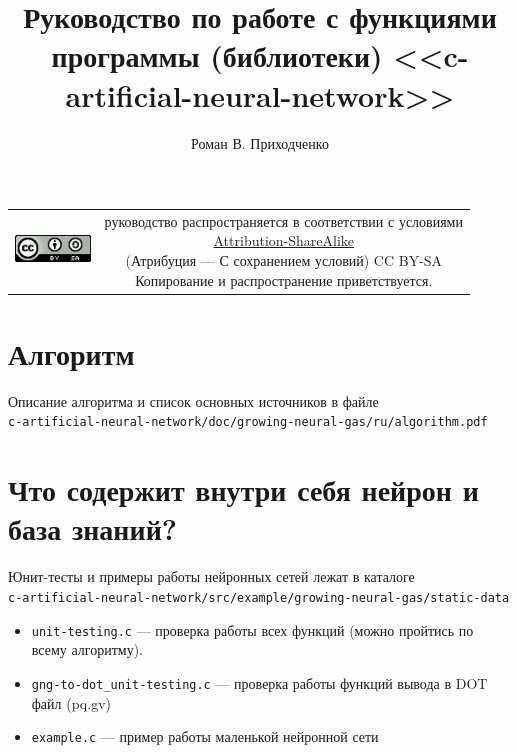 \documentclass[unicode, 12pt, a4paper,oneside,fleqn]{article}
\author{Роман В. Приходченко}
\title{Руководство по работе с функциями программы (библиотеки)
  <<c-artificial-neural-network>>}
\begin{document}
\renewcommand\bibname{СПИСОК ЛИТЕРАТУРЫ}
\renewcommand\refname{\centering Список литературы}
\renewcommand\contentsname{\centering Содержание}



\makeatletter %
\maketitle

\begin{table}[ht]
  \begin{tabular}{cc}
    \includegraphics[width=2cm]{../../../CC_BY-SA_88x31.png} &
    \shortstack{руководство распространяется в соответствии с
      условиями\\
      \href{http://creativecommons.org/licenses/by-sa/3.0/}{Attribution-ShareAlike} \\
      (Атрибуция — С сохранением условий) CC BY-SA \\
      Копирование и распространение приветствуется.}
  \end{tabular}
\end{table}

\newpage
\tableofcontents

\section{Алгоритм}
Описание алгоритма и список основных источников в файле\\
\verb'c-artificial-neural-network/doc/growing-neural-gas/ru/algorithm.pdf'


\clearpage
\section{Что содержит внутри себя нейрон и база знаний?}

Юнит-тесты и примеры работы нейронных сетей лежат в каталоге\\
\verb'c-artificial-neural-network/src/example/growing-neural-gas/static-data'
\begin{itemize}
\item \verb'unit-testing.c' --- проверка работы всех функций (можно
  пройтись по всему алгоритму). 
\item \verb'gng-to-dot_unit-testing.c' --- проверка работы функций
  вывода в DOT файл (pq.gv)
\item \verb'example.c' --- пример работы маленькой нейронной сети
\end{itemize}
\end{document}
